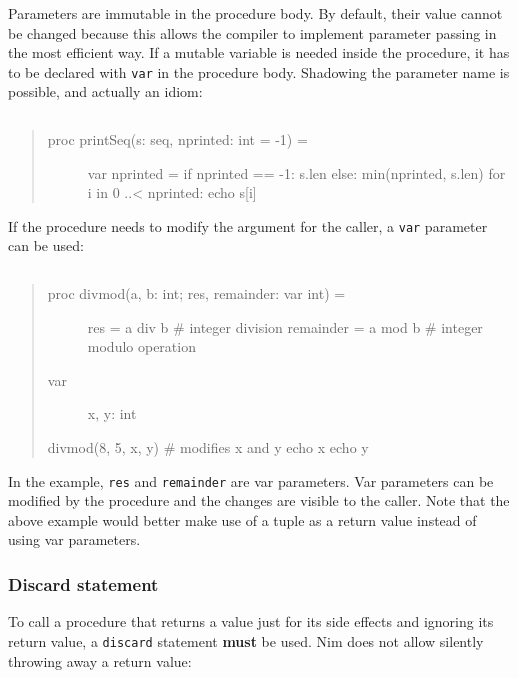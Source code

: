 Parameters are immutable in the procedure body. By default, their value
cannot be changed because this allows the compiler to implement
parameter passing in the most efficient way. If a mutable variable is
needed inside the procedure, it has to be declared with \texttt{var} in
the procedure body. Shadowing the parameter name is possible, and
actually an idiom:

\begin{verbatim}
\end{verbatim}

\begin{quote}
\begin{description}
\item[proc printSeq(s: seq, nprinted: int = -1) =]
var nprinted = if nprinted == -1: s.len else: min(nprinted, s.len) for i
in 0 ..\textless{} nprinted: echo s{[}i{]}
\end{description}
\end{quote}

If the procedure needs to modify the argument for the caller, a
\texttt{var} parameter can be used:

\begin{verbatim}
\end{verbatim}

\begin{quote}
\begin{description}
\item[proc divmod(a, b: int; res, remainder: var int) =]
res = a div b \# integer division remainder = a mod b \# integer modulo
operation
\item[var]
x, y: int
\end{description}

divmod(8, 5, x, y) \# modifies x and y echo x echo y
\end{quote}

In the example, \texttt{res} and \texttt{remainder} are {var
parameters}. Var parameters can be modified by the procedure and the
changes are visible to the caller. Note that the above example would
better make use of a tuple as a return value instead of using var
parameters.

\hypertarget{discard-statement}{%
\subsubsection{Discard statement}\label{discard-statement}}

To call a procedure that returns a value just for its side effects and
ignoring its return value, a \texttt{discard} statement \textbf{must} be
used. Nim does not allow silently throwing away a return value:

